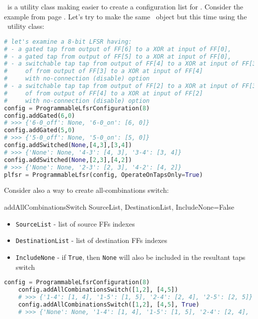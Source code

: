 \ProgrammableLfsrConfig\ is a utility class making easier to create a configuration list for \ProgrammableLfsr. Consider the example from page \pageref{programmablelfsrexample}. Let's try to make the same \ProgrammableLfsr\ object but this time using the \ProgrammableLfsrConfig\ utility class:
\begin{lstlisting}[language=Python]
# let's examine a 8-bit LFSR having:
# - a gated tap from output of FF[6] to a XOR at input of FF[0], 
# - a gated tap from output of FF[5] to a XOR at input of FF[0], 
# - a switchable tap tap from output of FF[4] to a XOR at input of FF[3]
#     of from output of FF[3] to a XOR at input of FF[4]
#     with no-connection (disable) option
# - a switchable tap tap from output of FF[2] to a XOR at input of FF[3]
#     of from output of FF[4] to a XOR at input of FF[2]
#     with no-connection (disable) option
config = ProgrammableLfsrConfiguration(8)
config.addGated(6,0)
# >>> {'6-0_off': None, '6-0_on': [6, 0]}
config.addGated(5,0)
# >>> {'5-0_off': None, '5-0_on': [5, 0]}
config.addSwitched(None,[4,3],[3,4])
# >>> {'None': None, '4-3': [4, 3], '3-4': [3, 4]}
config.addSwitched(None,[2,3],[4,2])
# >>> {'None': None, '2-3': [2, 3], '4-2': [4, 2]}
plfsr = ProgrammableLfsr(config, OperateOnTapsOnly=True)
\end{lstlisting}

Consider also a way to create all-combinations switch:

 {addAllCombinationsSwitch} {SourceList, DestinationList, IncludeNone=False} {
	\begin{itemize}
		\item \texttt{SourceList} - list of source FFs indexes
		\item \texttt{DestinationList} - list of destination FFs indexes
		\item \texttt{IncludeNone} - if \texttt{True}, then \texttt{None} will also be included in the resultant taps switch
	\end{itemize}
}
\begin{lstlisting}[language=Python]
	config = ProgrammableLfsrConfiguration(8)
	config.addAllCombinationsSwitch([1,2], [4,5])
	# >>> {'1-4': [1, 4], '1-5': [1, 5], '2-4': [2, 4], '2-5': [2, 5]}
	config.addAllCombinationsSwitch([1,2], [4,5], True)
	# >>> {'None': None, '1-4': [1, 4], '1-5': [1, 5], '2-4': [2, 4], '2-5': [2, 5]}
\end{lstlisting}
